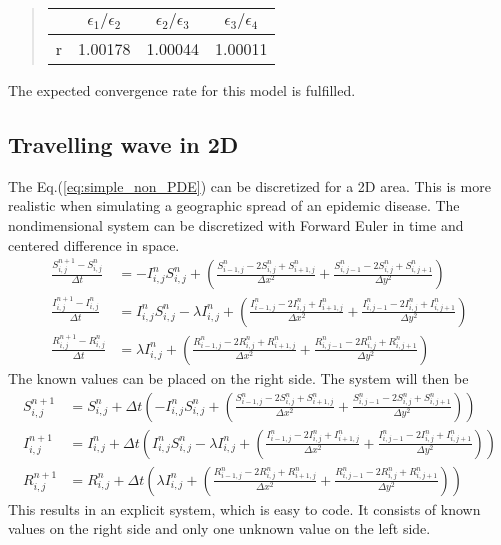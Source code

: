 \documentclass[%
twoside,                 %
final,                   %
chapterprefix=true,      %
open=right               %
10pt]{book}
\begin{document}
\begin{quote}
\begin{tabular}{cccc}
\hline
\multicolumn{1}{c}{  } & \multicolumn{1}{c}{ $\epsilon_1/\epsilon_2$ } & \multicolumn{1}{c}{ $\epsilon_2/\epsilon_3$ } & \multicolumn{1}{c}{ $\epsilon_3/\epsilon_4$ } \\
\hline
r & 1.00178                 & 1.00044                 & 1.00011                 \\
\hline
\end{tabular}
\end{quote}

\noindent
The expected convergence rate for this model is fulfilled.
\subsection{Travelling wave in 2D}
The Eq.(\ref{eq:simple_non_PDE}) can be discretized for a 2D area. This is more realistic when simulating a geographic spread of an epidemic disease. The nondimensional system  can be discretized with Forward Euler in time and centered difference in space.
\begin{equation} \label{eq:SIR_disc}
	\begin{aligned}
    \frac{S^{n+1}_{i,j}-S^n_{i,j}}{\Delta t} &= -I^{n}_{i,j}S^{n}_{i,j} + \left(\frac{S^{n}_{i-1,j}-2S^{n}_{i,j}+S^{n}_{i+1,j}}{\Delta x^2}+\frac{S^{n}_{i,j-1}-2S^{n}_{i,j}+S^{n}_{i,j+1}}{\Delta y^2}\right) \\
    \frac{I^{n+1}_{i,j}-I^n_{i,j}}{\Delta t} &= I^{n}_{i,j}S^{n}_{i,j} -\lambda I^{n}_{i,j} + \left(\frac{I^{n}_{i-1,j}-2I^{n}_{i,j}+I^{n}_{i+1,j}}{\Delta x^2}+\frac{I^{n}_{i,j-1}-2I^{n}_{i,j}+I^{n}_{i,j+1}}{\Delta y^2}\right) \\
    \frac{R^{n+1}_{i,j}-R^n_{i,j}}{\Delta t} &= \lambda I^{n}_{i,j}+\left(\frac{R^{n}_{i-1,j}-2R^{n}_{i,j}+R^{n}_{i+1,j}}{\Delta x^2}+\frac{R^{n}_{i,j-1}-2R^{n}_{i,j}+R^{n}_{i,j+1}}{\Delta y^2}\right) 
	\end{aligned}
\end{equation}
The known values can be placed on the right side. The system will then be
\begin{equation}
	\begin{aligned}
    S^{n+1}_{i,j} &= S^{n}_{i,j}+\Delta t\left(-I^{n}_{i,j}S^{n}_{i,j} + \left(\frac{S^{n}_{i-1,j}-2S^{n}_{i,j}+S^{n}_{i+1,j}}{\Delta x^2}+\frac{S^{n}_{i,j-1}-2S^{n}_{i,j}+S^{n}_{i,j+1}}{\Delta y^2}\right)\right) \\
    I^{n+1}_{i,j} &= I^{n}_{i,j}+\Delta t\left(I^{n}_{i,j}S^{n}_{i,j} -\lambda I^{n}_{i,j} + \left(\frac{I^{n}_{i-1,j}-2I^{n}_{i,j}+I^{n}_{i+1,j}}{\Delta x^2}+\frac{I^{n}_{i,j-1}-2I^{n}_{i,j}+I^{n}_{i,j+1}}{\Delta y^2}\right)\right) \\
    R^{n+1}_{i,j} &= R^{n}_{i,j}+\Delta t\left(\lambda I^{n}_{i,j}+\left(\frac{R^{n}_{i-1,j}-2R^{n}_{i,j}+R^{n}_{i+1,j}}{\Delta x^2}+\frac{R^{n}_{i,j-1}-2R^{n}_{i,j}+R^{n}_{i,j+1}}{\Delta y^2}\right)\right) 
	\end{aligned}
\end{equation}
This results in an explicit system, which is easy to code. It consists of known values on the right side and only one unknown value on the left side.
\end{document}
